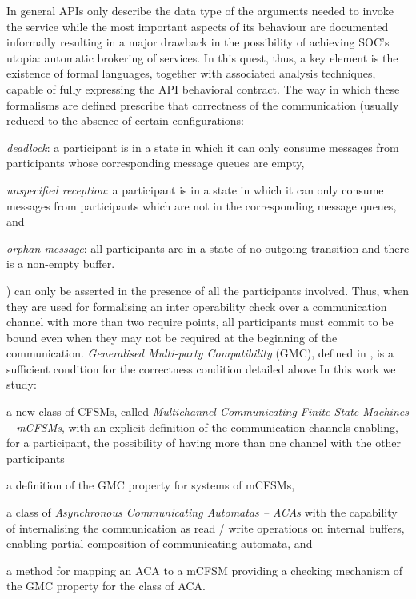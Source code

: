 In general APIs only describe the data type of the arguments needed to invoke the service while the most important aspects of its behaviour are documented informally resulting in a major drawback in the possibility of achieving SOC's utopia: automatic brokering of services. In this quest, thus, a key element is the existence of formal languages, together with associated analysis techniques, capable of fully expressing the API behavioral contract.
The way in which these formalisms are defined prescribe that correctness of the communication (usually reduced to the absence of certain configurations\cite{lange:popl15}:
\begin{inparaenum}[1)]
\item \emph{deadlock}: a participant is in a state in which it can only consume messages from participants whose corresponding message queues are empty,
\item \emph{unspecified reception}: a participant is in a state in which it can only consume messages from participants which are not in the corresponding message queues, and
\item \emph{orphan message}: all participants are in a state of no outgoing transition and there is a non-empty buffer.
\end{inparaenum}
) can only be asserted in the presence of all the participants involved. Thus, when they are used for formalising an inter operability check over a communication channel with more than two require points, all participants must commit to be bound even when they may not be required at the beginning of the communication.
\emph{Generalised Multi-party Compatibility} (GMC), defined in \cite{lange:popl15}, is a sufficient condition for the correctness condition detailed above
In this work we study:
\begin{inparaenum}[1)]
 \item a new class of CFSMs, called \emph{Multichannel Communicating Finite State Machines -- mCFSMs}, with an explicit definition of the communication channels enabling, for a participant, the possibility of having more than one channel with the other participants
 \item a definition of the GMC property for systems of mCFSMs, 
 \item a class of \emph{Asynchronous Communicating Automatas -- ACAs} with the capability of internalising the communication as read / write operations on internal buffers, enabling partial composition of communicating automata, and
 \item a method for mapping an ACA to a mCFSM providing a checking mechanism of the GMC property for the class of ACA.
 \end{inparaenum}

